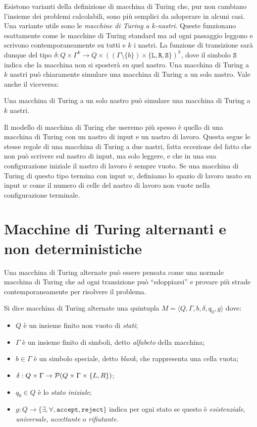Esistono varianti della definizione di macchina di Turing che, pur non cambiano
l'insieme dei problemi calcolabili, sono più semplici da adoperare in alcuni
casi. Una variante utile sono le
\emph{macchine di Turing a $k$-nastri}. Queste funzionano esattamente come le
macchine di Turing standard ma ad ogni passaggio leggono e scrivono contemporaneamente su
tutti e $k$ i nastri. La funzione di transizione sarà dunque del tipo
$\delta:  Q \times \Gamma^k \to Q \times ((\Gamma \setminus \{b\}) \times \{\texttt{L},\texttt{R},\texttt{S}\})^k$,
dove il simbolo $\texttt{S}$ indica che la macchina non si sposterà su quel nastro.
Una macchina di Turing a $k$ nastri può chiaramente simulare una macchina di Turing
a un solo nastro. Vale anche il viceversa:

\begin{fatto}
Una macchina di Turing a un solo nastro può simulare una macchina di Turing
a $k$ nastri.
\end{fatto}

Il modello di macchina di Turing che useremo più spesso è quello di una macchina di Turing
con un nastro di input e un nastro di lavoro. Questa segue le stesse regole di
una macchina di Turing a due nastri, fatta eccezione del fatto che non può scrivere
sul nastro di input, ma solo leggere, e che in una sua configurazione iniziale
il nastro di lavoro è sempre vuoto. Se una macchina di Turing di questo tipo
termina con input $w$, definiamo lo spazio di lavoro usato su input $w$
come il numero di celle del nastro di lavoro non vuote nella configurazione terminale.


\section{Macchine di Turing alternanti e non deterministiche}
Una macchina di Turing alternate può essere pensata come una normale macchina di
Turing che ad ogni transizione può ``sdoppiarsi'' e provare più strade contemporaneamente
per risolvere il problema.

\begin{definizione}
 Si dice macchina di Turing alternate una quintupla
 $M=\langle Q, \Gamma, b, \delta, q_0, g \rangle$ dove:
 \begin{itemize}
  \item $Q$ è un insieme finito non vuoto di \emph{stati};
  \item $\Gamma$ è un insieme finito di simboli, detto \emph{alfabeto} della macchina;
  \item $b \in \Gamma$ è un simbolo speciale, detto \emph{blank}, che rappresenta
  una cella vuota;
  \item $\delta: Q \times \Gamma \to \mathcal{P}(Q \times \Gamma \times \{L,R\})$;
  \item $q_0 \in Q$ è lo \emph{stato iniziale};
  \item $g: Q \to \{\exists, \forall, \texttt{accept}, \texttt{reject}\}$
  indica per ogni stato se questo è \emph{esistenziale}, \emph{universale},
  \emph{accettante} o \emph{rifiutante}.
 \end{itemize}
\end{definizione}

